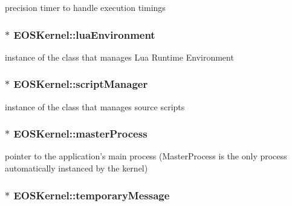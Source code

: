 precision timer to handle execution timings 

\hypertarget{structEOSKernel_5b6a6d064e015c2db02ed67ca224f080}{
\subsubsection[{luaEnvironment}]{$\ast$ {\bf EOSKernel::luaEnvironment}}}
\label{structEOSKernel_5b6a6d064e015c2db02ed67ca224f080}


instance of the class that manages Lua Runtime Environment 

\hypertarget{structEOSKernel_b48245e1274b86370aebc583430b9199}{
\subsubsection[{scriptManager}]{$\ast$ {\bf EOSKernel::scriptManager}}}
\label{structEOSKernel_b48245e1274b86370aebc583430b9199}


instance of the class that manages source scripts 

\hypertarget{structEOSKernel_7224243c464c099b92494f3a06eeb99e}{
\subsubsection[{masterProcess}]{$\ast$ {\bf EOSKernel::masterProcess}}}
\label{structEOSKernel_7224243c464c099b92494f3a06eeb99e}


pointer to the application's main process (MasterProcess is the only process automatically instanced by the kernel) 

\hypertarget{structEOSKernel_a755627acbc4b4b61d4fcbdef216baef}{
\subsubsection[{temporaryMessage}]{$\ast$ {\bf EOSKernel::temporaryMessage}}}
\label{structEOSKernel_a755627acbc4b4b61d4fcbdef216baef}



